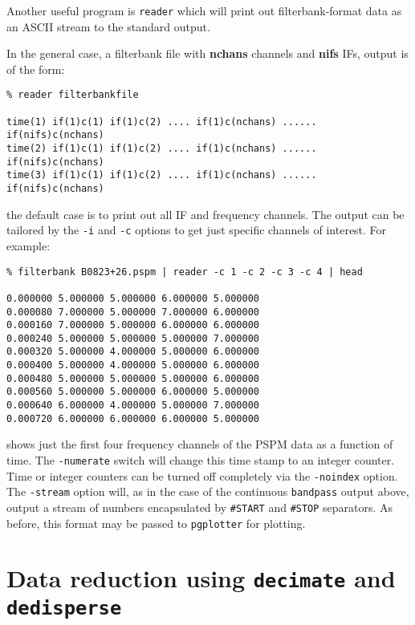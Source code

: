 \documentclass[11pt]{article}
\begin{document}
Another useful program is {\tt reader} which will
print out filterbank-format data as an ASCII stream to the 
standard output. 

In the general case, a filterbank file with 
{\bf nchans} channels and {\bf nifs} IFs, output is of the form:
\begin{verbatim}
% reader filterbankfile

time(1) if(1)c(1) if(1)c(2) .... if(1)c(nchans) ...... if(nifs)c(nchans)
time(2) if(1)c(1) if(1)c(2) .... if(1)c(nchans) ...... if(nifs)c(nchans)
time(3) if(1)c(1) if(1)c(2) .... if(1)c(nchans) ...... if(nifs)c(nchans)
\end{verbatim}
the default case is to print out all IF and frequency channels.
The output can be tailored by the {\tt -i} and {\tt -c} options
to get just specific channels of interest. For example:
\begin{verbatim}
% filterbank B0823+26.pspm | reader -c 1 -c 2 -c 3 -c 4 | head

0.000000 5.000000 5.000000 6.000000 5.000000 
0.000080 7.000000 5.000000 7.000000 6.000000 
0.000160 7.000000 5.000000 6.000000 6.000000 
0.000240 5.000000 5.000000 5.000000 7.000000 
0.000320 5.000000 4.000000 5.000000 6.000000 
0.000400 5.000000 4.000000 5.000000 6.000000 
0.000480 5.000000 5.000000 5.000000 6.000000 
0.000560 5.000000 5.000000 6.000000 5.000000 
0.000640 6.000000 4.000000 5.000000 7.000000 
0.000720 6.000000 6.000000 6.000000 5.000000 
\end{verbatim}
shows just the first four frequency channels of the PSPM data
as a function of time. The {\tt -numerate} switch will
change this time stamp to an integer counter. Time or
integer counters can be turned off completely via the
{\tt -noindex} option. The {\tt -stream} option will,
as in the case of the continuous {\tt bandpass} output
above, output a stream of numbers encapsulated by
\verb+#START+ and \verb+#STOP+ separators. As before, this
format may be passed to {\tt pgplotter} for plotting.

\section{Data reduction using {\tt decimate} and {\tt dedisperse}}
\label{reduction}
\end{document}
